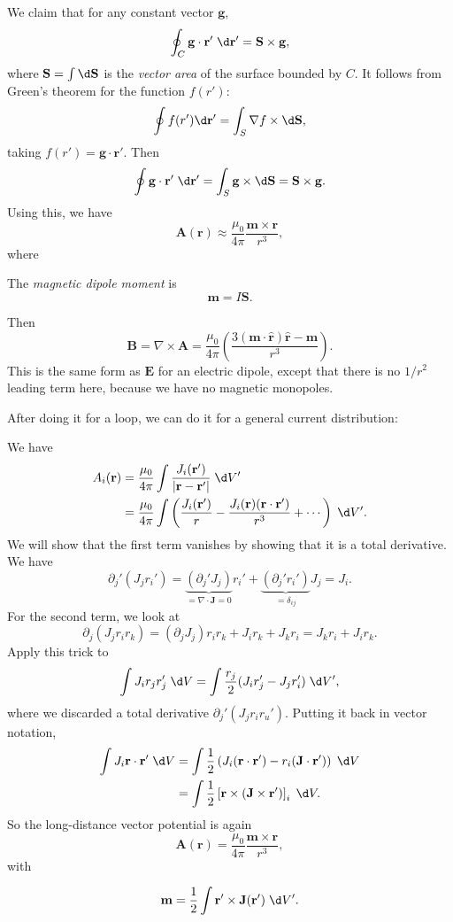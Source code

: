 \documentclass[a4paper]{article}
\begin{document}
\begin{eg}
  We claim that for any constant vector $\mathbf{g}$,
  \[
    \oint_C \mathbf{g}\cdot \mathbf{r}' \;\d \mathbf{r}' = \mathbf{S}\times \mathbf{g},
  \]
  where $\mathbf{S} = \int \d \mathbf{\mathbf{S}}$ is the \emph{vector area} of the surface bounded by $C$. It follows from Green's theorem for the function $f(r')$:
  \[
    \oint f(r')\d \mathbf{r}' = \int_S \nabla f\times\d \mathbf{S},
  \]
  taking $f(r') = \mathbf{g}\cdot \mathbf{r}'$. Then
  \[
    \oint \mathbf{g}\cdot \mathbf{r}'\;\d \mathbf{r}' = \int_S \mathbf{g}\times \d \mathbf{S} = \mathbf{S}\times \mathbf{g}.
  \]
  Using this, we have
  \[
    \mathbf{A}(\mathbf{r}) \approx \frac{\mu_0}{4\pi}\frac{\mathbf{m}\times \mathbf{r}}{r^3},
  \]
  where
  \begin{defi} The \emph{magnetic dipole moment} is
    \[
      \mathbf{m} = I\mathbf{S}.
    \]
  \end{defi}
  Then
  \[
    \mathbf{B} = \nabla\times \mathbf{A} = \frac{\mu_0}{4\pi}\left(\frac{3(\mathbf{m}\cdot \hat{\mathbf{r}})\hat{\mathbf{r}} - \mathbf{m}}{r^3}\right).
  \]
  This is the same form as $\mathbf{E}$ for an electric dipole, except that there is no $1/r^2$ leading term here, because we have no magnetic monopoles.
\end{eg}

After doing it for a loop, we can do it for a general current distribution:
\begin{eg}
  We have
  \begin{align*}
    A_i(\mathbf{r}) &= \frac{\mu_0}{4\pi}\int \frac{J_i(\mathbf{r}')}{|\mathbf{r} - \mathbf{r}'|}\;\d V'\\
    &= \frac{\mu_0}{4\pi}\int\left(\frac{J_i(\mathbf{r}')}{r} - \frac{J_i(\mathbf{r})(\mathbf{r}\cdot \mathbf{r}')}{r^3} + \cdots\right)\;\d V'.
  \end{align*}
  We will show that the first term vanishes by showing that it is a total derivative. We have
  \[
    \partial_j'(J_jr_i') = \underbrace{(\partial_j'J_j)}_{=\nabla\cdot \mathbf{J} = 0}r_i' + \underbrace{(\partial_j'r_i')}_{=\delta_{ij}}J_j = J_i.
  \]
  For the second term, we look at
  \[
    \partial_j (J_jr_ir_k) = (\partial_jJ_j)r_ir_k + J_ir_k + J_kr_i =J_kr_i + J_ir_k.
  \]
  Apply this trick to
  \[
    \int J_ir_jr'_j \;\d V = \int \frac{r_j}{2}(J_i r_j' - J_j r'_i)\;\d V',
  \]
  where we discarded a total derivative $\partial_j'(J_jr_ir_u')$. Putting it back in vector notation,
  \begin{align*}
    \int J_i\mathbf{r}\cdot \mathbf{r}'\;\d V &= \int\frac{1}{2}\left(J_i(\mathbf{r}\cdot \mathbf{r}') - r_i(\mathbf{J}\cdot \mathbf{r}')\right)\;\d V\\
    &= \int \frac{1}{2}\left[\mathbf{r}\times (\mathbf{J}\times \mathbf{r}')\right]_i\;\d V.
  \end{align*}
  So the long-distance vector potential is again
  \[
    \mathbf{A} (\mathbf{r}) = \frac{\mu_0}{4\pi}\frac{\mathbf{m}\times \mathbf{r}}{r^3},
  \]
  with
  \begin{defi}
    \[
      \mathbf{m} = \frac{1}{2}\int \mathbf{r}'\times \mathbf{J}(\mathbf{r}')\;\d V'.
    \]
  \end{defi}
\end{eg}
\end{document}

